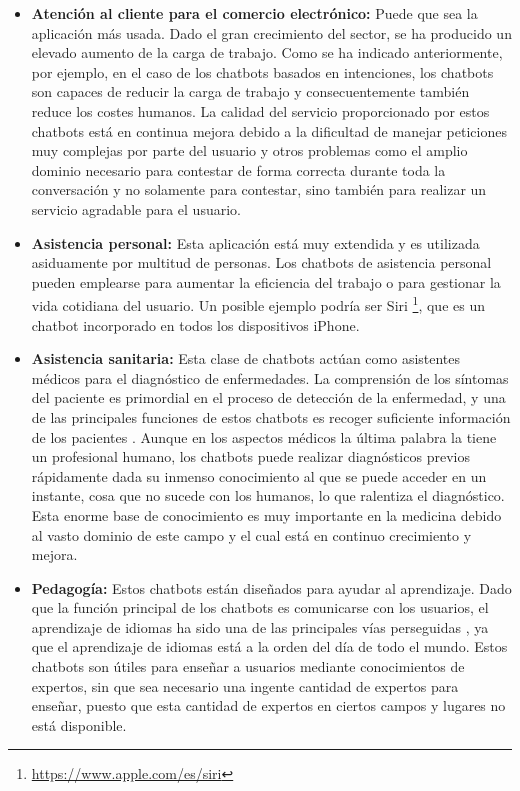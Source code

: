 \begin{itemize}
\item \textbf{Atención al cliente para el comercio electrónico:} Puede que sea la aplicación más usada. Dado el gran crecimiento del sector, se ha producido un elevado aumento de la carga de trabajo. Como se ha indicado anteriormente, por ejemplo, en el caso de los chatbots basados en intenciones, los chatbots son capaces de reducir la carga de trabajo y consecuentemente también reduce los costes humanos. La calidad del servicio proporcionado por estos chatbots está en continua mejora debido a la dificultad de manejar peticiones muy complejas por parte del usuario y otros problemas como el amplio dominio necesario para contestar de forma correcta durante toda la conversación y no solamente para contestar, sino también para realizar un servicio agradable para el usuario.
\item \textbf{Asistencia personal:} Esta aplicación está muy extendida y es utilizada asiduamente por multitud de personas. Los chatbots de asistencia personal pueden emplearse para aumentar la eficiencia del trabajo o para gestionar la vida cotidiana del usuario. Un posible ejemplo podría ser Siri \footnote{\url{https://www.apple.com/es/siri}}, que es un chatbot incorporado en todos los dispositivos iPhone.
\item \textbf{Asistencia sanitaria:} Esta clase de chatbots actúan como asistentes médicos para el diagnóstico de enfermedades. La comprensión de los síntomas del paciente es primordial en el proceso de detección de la enfermedad, y una de las principales funciones de estos chatbots es recoger suficiente información de los pacientes \cite{RefWorks:RefID:36-luo2022critical}. Aunque en los aspectos médicos la última palabra la tiene un profesional humano, los chatbots puede realizar diagnósticos previos rápidamente dada su inmenso conocimiento al que se puede acceder en un instante, cosa que no sucede con los humanos, lo que ralentiza el diagnóstico. Esta enorme base de conocimiento es muy importante en la medicina debido al vasto dominio de este campo y el cual está en continuo crecimiento y mejora.
\item \textbf{Pedagogía:} Estos chatbots están diseñados para ayudar al aprendizaje. Dado que la función principal de los chatbots es comunicarse con los usuarios, el aprendizaje de idiomas ha sido una de las principales vías perseguidas \cite{RefWorks:RefID:36-luo2022critical}, ya que el aprendizaje de idiomas está a la orden del día de todo el mundo. Estos chatbots son útiles para enseñar a usuarios mediante conocimientos de expertos, sin que sea necesario una ingente cantidad de expertos para enseñar, puesto que esta cantidad de expertos en ciertos campos y lugares no está disponible.
\end{itemize}

